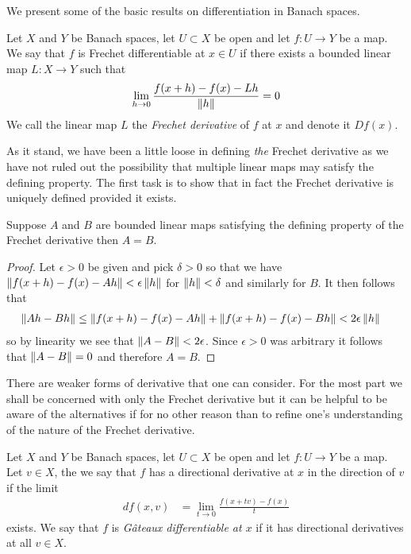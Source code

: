 We present some of the basic results on differentiation in Banach
spaces.

\begin{defn}Let $X$ and $Y$ be Banach spaces, let $U \subset X$ be
  open and let $f : U \to Y$ be
  a map.  We say that $f$ is Frechet differentiable at $x \in U$ if there
  exists a bounded linear map $L : X \to Y$ such that
\begin{align*}
\lim_{h \to 0} \frac{f(x + h) - f(x) -Lh}{\left \lVert h \right \rVert} = 0
\end{align*}
We call the linear map $L$ the \emph{Frechet derivative} of $f$ at $x$
and denote it $Df(x)$.
\end{defn}

As it stand, we have been a little loose in defining \emph{the}
Frechet derivative as we have not ruled out the possibility that
multiple linear maps may satisfy the defining property.   The first
task is to show that in fact the Frechet derivative is uniquely
defined provided it exists.

\begin{prop}Suppose $A$ and $B$ are bounded linear maps satisfying the
  defining property of the Frechet derivative then $A = B$.
\end{prop}
\begin{proof}
Let $\epsilon > 0$ be given and pick $\delta > 0$ so that we have
$\left \lVert f(x+h) - f(x) -Ah \right \rVert < \epsilon \left \lVert h \right \rVert$ for $\left \lVert h \right \rVert < \delta$
and similarly for $B$.  It then follows that
\begin{align*}
\left \lVert Ah - Bh \right \rVert &\leq \left \lVert f(x+h) - f(x) -Ah \right \rVert + \left \lVert f(x+h) - f(x)
                 -Bh \right \rVert < 2 \epsilon \left \lVert h \right \rVert
\end{align*}
so by linearity we see that $\left \lVert A - B \right \rVert < 2 \epsilon$.  Since
$\epsilon>0$ was arbitrary it follows that $\left \lVert A -B \right \rVert = 0$ and
therefore $A = B$.
\end{proof}

There are weaker forms of derivative that one can consider.  For the
most part we shall be concerned with only the Frechet derivative but
it can be helpful to be aware of the alternatives if for no other
reason than to refine one's understanding of the nature of the Frechet derivative.
\begin{defn}Let $X$ and $Y$ be Banach spaces, let $U \subset X$ be
  open and let $f : U \to Y$ be
  a map.  Let $v \in X$, the we say that $f$ has a directional
  derivative at $x$ in the direction of $v$ if the limit 
\begin{align*}
df(x,v) &= \lim_{t \to
    0} \frac{f(x + tv) - f(x)}{t}
\end{align*} 
exists.  We say that $f$ is
  \emph{G\^{a}teaux differentiable at $x$} if it has directional
  derivatives at all $v \in X$.
\end{defn}

